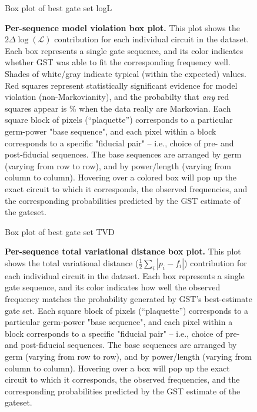 \documentclass{article}[11pt]
\newcommand{\putfield}[2]{#2}
\begin{document}
{{\begin{figure}
  \begin{center}
    \begin{adjustbox}{max width=\textwidth}
      \putfield{final_model_fit_colorbox_plot}{Box plot of best gate set logL}
    \end{adjustbox}
    \caption{\textbf{Per-sequence model violation box plot.}  This plot shows the $2\Delta\log(\mathcal{L})$ contribution for each individual circuit in the dataset.  Each box represents a single gate sequence, and its color indicates whether GST was able to fit the corresponding frequency well.  Shades of white/gray indicate typical (within the expected) values. Red squares represent statistically significant evidence for model violation (non-Markovianity), and the probabilty that \emph{any} red squares appear is \putfield{linlg_pcntle}{}\% when the data really are Markovian. Each square block of pixels (``plaquette'') corresponds to a particular germ-power "base sequence", and each pixel within a block corresponds to a specific "fiducial pair" -- i.e., choice of pre- and post-fiducial sequences.  The base sequences are arranged by germ (varying from row to row), and by power/length (varying from column to column).  Hovering over a colored box will pop up the exact circuit to which it corresponds, the observed frequencies, and the corresponding probabilities predicted by the GST estimate of the gateset.\label{final_model_fit_colorbox_plot}}
\end{center}
\end{figure}

\begin{figure}
  \begin{center}
    \begin{adjustbox}{max width=\textwidth}
      \putfield{final_model_tvd_colorbox_plot}{Box plot of best gate set TVD}
    \end{adjustbox}
    \caption{\textbf{Per-sequence total variational distance box plot.}  This plot shows the total variational distance ($\frac{1}{2}\sum_i|p_i-f_i|$) contribution for each individual circuit in the dataset.  Each box represents a single gate sequence, and its color indicates how well the observed frequency matches the probability generated by GST's best-estimate gate set.  Each square block of pixels (``plaquette'') corresponds to a particular germ-power "base sequence", and each pixel within a block corresponds to a specific "fiducial pair" -- i.e., choice of pre- and post-fiducial sequences.  The base sequences are arranged by germ (varying from row to row), and by power/length (varying from column to column).  Hovering over a box will pop up the exact circuit to which it corresponds, the observed frequencies, and the corresponding probabilities predicted by the GST estimate of the gateset.\label{final_model_tvd_colorbox_plot}}
\end{center}
\end{figure}


}}
\end{document}
